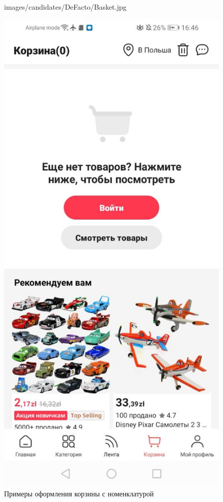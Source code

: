 \begin{figure}[!p]
\begin{minipage}{0.16\textwidth}
    {images/candidates/DeFacto/Basket.jpg}
  \end{minipage}
  \begin{minipage}{0.16\textwidth}
    \includegraphics[width=.99\linewidth]
    {images/candidates/AliExpress/Basket.jpg}
  \end{minipage}

  \caption{Примеры оформления корзины с номенклатурой}\label{fig:analyzBasket}
\end{figure}


